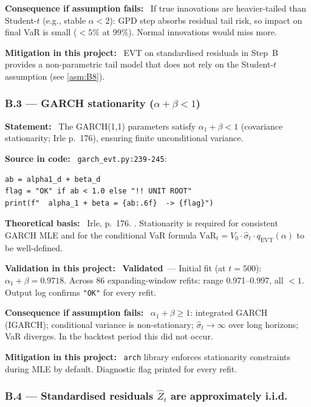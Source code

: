 \documentclass[11pt,a4paper]{article}
\newcommand{\asmfield}[1]{\medskip\noindent\textbf{#1:}\ }
\newcommand{\code}[1]{\texttt{#1}}
\newcommand{\validated}{\textbf{Validated}}
\begin{document}
\asmfield{Consequence if assumption fails}
If true innovations are heavier-tailed than Student-$t$ (e.g., stable
$\alpha < 2$): GPD step absorbs residual tail risk, so impact on final
VaR is small ($< 5\%$ at 99\%). Normal innovations would miss more.

\asmfield{Mitigation in this project}
EVT on standardised residuals in Step~B provides a non-parametric tail
model that does not rely on the Student-$t$ assumption (see \cref{asm:B8}).

\subsubsection{B.3 --- GARCH stationarity ($\alpha + \beta < 1$)}\label{asm:B3}

\asmfield{Statement}
The GARCH(1,1) parameters satisfy $\alpha_1 + \beta < 1$ (covariance
stationarity; Irle p.~176), ensuring finite unconditional variance.

\asmfield{Source in code}
\code{garch\_evt.py:239-245}:
\begin{lstlisting}
ab = alpha1_d + beta_d
flag = "OK" if ab < 1.0 else "!! UNIT ROOT"
print(f"  alpha_1 + beta = {ab:.6f}  -> {flag}")
\end{lstlisting}

\asmfield{Theoretical basis}
Irle, p.~176. \cite{Bollerslev1986}. Stationarity is required for
consistent GARCH MLE and for the conditional VaR formula
$\text{VaR}_t = V_0 \cdot \hat{\sigma}_t \cdot q_{\mathrm{EVT}}(\alpha)$
to be well-defined.

\asmfield{Validation in this project}
\validated\ --- Initial fit (at $t = 500$): $\alpha_1 + \beta = 0.9718$.
Across 86 expanding-window refits: range 0.971--0.997, all $< 1$.
Output log confirms \code{"OK"} for every refit.

\asmfield{Consequence if assumption fails}
$\alpha_1 + \beta \ge 1$: integrated GARCH (IGARCH); conditional variance
is non-stationary; $\hat{\sigma}_t \to \infty$ over long horizons; VaR
diverges. In the backtest period this did not occur.

\asmfield{Mitigation in this project}
\code{arch} library enforces stationarity constraints during MLE by
default. Diagnostic flag printed for every refit.

\subsubsection{B.4 --- Standardised residuals $\hat{Z}_t$ are approximately i.i.d.}\label{asm:B4}
\end{document}
